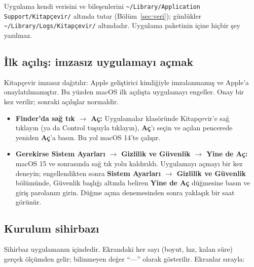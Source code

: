 \documentclass[11pt,a4paper]{article}
\newcommand{\dugme}[1]{\textsf{\bfseries #1}}
\newcommand{\dosya}[1]{\texttt{#1}}
\newcommand{\ok}{\(\rightarrow\)}
\begin{document}
Uygulama kendi verisini ve bileşenlerini
\dosya{\textasciitilde/Library/\allowbreak Application Support/\allowbreak Kitapçevir/}
altında tutar (Bölüm~\ref{sec:veri}); günlükler
\dosya{\textasciitilde/Library/\allowbreak Logs/\allowbreak Kitapçevir/}
altındadır. Uygulama paketinin içine hiçbir şey yazılmaz.

\subsection{İlk açılış: imzasız uygulamayı açmak}\label{sec:ilkacilis}
Kitapçevir imzasız dağıtılır: Apple geliştirici kimliğiyle imzalanmamış ve
Apple'a onaylatılmamıştır. Bu yüzden macOS ilk açılışta uygulamayı engeller.
Onay bir kez verilir; sonraki açılışlar normaldir.

\begin{itemize}
  \item \textbf{Finder'da sağ tık \ok{} Aç:} Uygulamalar klasöründe
        Kitapçevir'e sağ tıklayın (ya da Control tuşuyla tıklayın),
        \dugme{Aç}'ı seçin ve açılan pencerede yeniden \dugme{Aç}'a basın. Bu
        yol macOS 14'te çalışır.
  \item \textbf{Gerekirse Sistem Ayarları \ok{} Gizlilik ve Güvenlik \ok{}
        Yine de Aç:} macOS 15 ve sonrasında sağ tık yolu kaldırıldı.
        Uygulamayı açmayı bir kez deneyin; engellendikten sonra
        \textbf{Sistem Ayarları \ok{} Gizlilik ve Güvenlik} bölümünde,
        Güvenlik başlığı altında beliren \dugme{Yine de Aç} düğmesine basın ve
        giriş parolanızı girin. Düğme açma denemesinden sonra yaklaşık bir saat
        görünür.
\end{itemize}

\subsection{Kurulum sihirbazı}
Sihirbaz uygulamanın içindedir. Ekrandaki her sayı (boyut, hız, kalan süre)
gerçek ölçümden gelir; bilinmeyen değer ``---'' olarak gösterilir. Ekranlar
sırayla:
\end{document}
